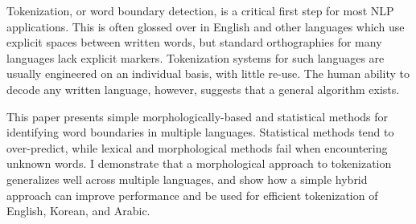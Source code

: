 Tokenization, or word boundary detection, is a critical first step for most NLP applications. This is often glossed over in English and other languages which use explicit spaces between written words, but standard orthographies for many languages lack explicit markers. Tokenization systems for such languages are usually engineered on an individual basis, with little re-use. The human ability to decode any written language, however, suggests that a general algorithm exists.

This paper presents simple morphologically-based and statistical methods for identifying word boundaries in multiple languages. Statistical methods tend to over-predict, while lexical and morphological methods fail when encountering unknown words. I demonstrate that a morphological approach to tokenization generalizes well across multiple languages, and show how a simple hybrid approach can improve performance and be used for efficient tokenization of English, Korean, and Arabic.